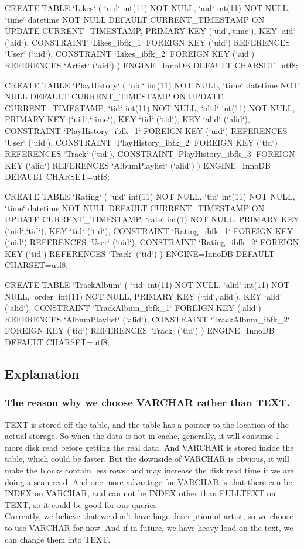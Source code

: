 \documentclass[letterpaper, 12pt]{report}
\begin{document}
\begin{spverbatim}
	CREATE TABLE `Likes` (
	`uid` int(11) NOT NULL,
	`aid` int(11) NOT NULL,
	`time` datetime NOT NULL DEFAULT CURRENT_TIMESTAMP ON UPDATE CURRENT_TIMESTAMP,
	PRIMARY KEY (`uid`,`time`),
	KEY `aid` (`aid`),
	CONSTRAINT `Likes_ibfk_1` FOREIGN KEY (`uid`) REFERENCES `User` (`uid`),
	CONSTRAINT `Likes_ibfk_2` FOREIGN KEY (`aid`) REFERENCES `Artist` (`aid`)
	) ENGINE=InnoDB DEFAULT CHARSET=utf8;
	
	CREATE TABLE `PlayHistory` (
	`uid` int(11) NOT NULL,
	`time` datetime NOT NULL DEFAULT CURRENT_TIMESTAMP ON UPDATE CURRENT_TIMESTAMP,
	`tid` int(11) NOT NULL,
	`alid` int(11) NOT NULL,
	PRIMARY KEY (`uid`,`time`),
	KEY `tid` (`tid`),
	KEY `alid` (`alid`),
	CONSTRAINT `PlayHistory_ibfk_1` FOREIGN KEY (`uid`) REFERENCES `User` (`uid`),
	CONSTRAINT `PlayHistory_ibfk_2` FOREIGN KEY (`tid`) REFERENCES `Track` (`tid`),
	CONSTRAINT `PlayHistory_ibfk_3` FOREIGN KEY (`alid`) REFERENCES `AlbumPlaylist` (`alid`)
	) ENGINE=InnoDB DEFAULT CHARSET=utf8;
	
	CREATE TABLE `Rating` (
	`uid` int(11) NOT NULL,
	`tid` int(11) NOT NULL,
	`time` datetime NOT NULL DEFAULT CURRENT_TIMESTAMP ON UPDATE CURRENT_TIMESTAMP,
	`rate` int(1) NOT NULL,
	PRIMARY KEY (`uid`,`tid`),
	KEY `tid` (`tid`),
	CONSTRAINT `Rating_ibfk_1` FOREIGN KEY (`uid`) REFERENCES `User` (`uid`),
	CONSTRAINT `Rating_ibfk_2` FOREIGN KEY (`tid`) REFERENCES `Track` (`tid`)
	) ENGINE=InnoDB DEFAULT CHARSET=utf8;
	
	CREATE TABLE `TrackAlbum` (
	`tid` int(11) NOT NULL,
	`alid` int(11) NOT NULL,
	`order` int(11) NOT NULL,
	PRIMARY KEY (`tid`,`alid`),
	KEY `alid` (`alid`),
	CONSTRAINT `TrackAlbum_ibfk_1` FOREIGN KEY (`alid`) REFERENCES `AlbumPlaylist` (`alid`),
	CONSTRAINT `TrackAlbum_ibfk_2` FOREIGN KEY (`tid`) REFERENCES `Track` (`tid`)
	) ENGINE=InnoDB DEFAULT CHARSET=utf8;
	\end{spverbatim}
	\subsection{Explanation}
	\subsubsection{The reason why we choose VARCHAR rather than TEXT.}
	TEXT is stored off the table, and the table has a pointer to the location of the actual storage. So when the data is not in cache, generally, it will consume 1 more disk read before getting the real data. And VARCHAR is stored inside the table, which could be faster. But the downside of VARCHAR is obvious, it will make the blocks contain less rows, and may increase the disk read time if we are doing a scan read. And one more advantage for VARCHAR is that there can be INDEX on VARCHAR, and can not be INDEX other than FULLTEXT on TEXT, so it could be good for our queries.\\
	Currently, we believe that we don't have huge description of artist, so we choose to use VARCHAR for now. And if in future, we have heavy load on the text, we can change them into TEXT.
	
\end{document}
